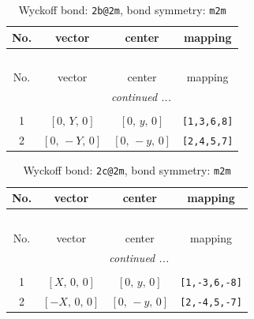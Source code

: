 \documentclass[fleqn,8pt]{jsarticle}
\begin{document}
\renewcommand{\arraystretch}{1.2}
\begin{longtable}{cccc}
\caption{Wyckoff bond: {\tt 2b@2m}, bond symmetry: {\tt m2m}}
 \\
 \hline \hline
No. & vector & center & mapping \\ \hline \endfirsthead

\multicolumn{3}{l}{\tablename\ \thetable{}} \\
 \hline \hline
No. & vector & center & mapping \\ \hline \endhead

 \hline \hline
\multicolumn{3}{r}{\footnotesize\it continued ...} \\ \endfoot

 \hline \hline
\multicolumn{3}{r}{} \\ \endlastfoot

1 & $\left[ 0,\, Y,\, 0 \right]$ & $\left[ 0,\, y,\, 0 \right]$ & {\tt [1,3,6,8]} \\ \hline
2 & $\left[ 0,\, - Y,\, 0 \right]$ & $\left[ 0,\, - y,\, 0 \right]$ & {\tt [2,4,5,7]} \\
\end{longtable}
\renewcommand{\arraystretch}{1.2}
\begin{longtable}{cccc}
\caption{Wyckoff bond: {\tt 2c@2m}, bond symmetry: {\tt m2m}}
 \\
 \hline \hline
No. & vector & center & mapping \\ \hline \endfirsthead

\multicolumn{3}{l}{\tablename\ \thetable{}} \\
 \hline \hline
No. & vector & center & mapping \\ \hline \endhead

 \hline \hline
\multicolumn{3}{r}{\footnotesize\it continued ...} \\ \endfoot

 \hline \hline
\multicolumn{3}{r}{} \\ \endlastfoot

1 & $\left[ X,\, 0,\, 0 \right]$ & $\left[ 0,\, y,\, 0 \right]$ & {\tt [1,-3,6,-8]} \\ \hline
2 & $\left[ - X,\, 0,\, 0 \right]$ & $\left[ 0,\, - y,\, 0 \right]$ & {\tt [2,-4,5,-7]} \\
\end{longtable}
\renewcommand{\arraystretch}{1.2}
\end{document}
